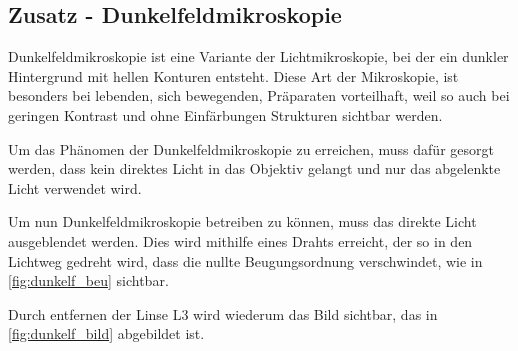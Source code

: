 \documentclass[11pt,ngerman]{scrartcl}
\begin{document}
\vspace{2mm}

\subsection{Zusatz - Dunkelfeldmikroskopie}

Dunkelfeldmikroskopie ist eine Variante der Lichtmikroskopie, bei der ein
dunkler Hintergrund mit hellen Konturen entsteht. Diese Art der Mikroskopie,
ist besonders bei lebenden, sich bewegenden, Präparaten vorteilhaft, weil so
auch bei geringen Kontrast und ohne Einfärbungen Strukturen sichtbar werden.

\newpage

Um das Phänomen der Dunkelfeldmikroskopie zu erreichen, muss dafür gesorgt
werden, dass kein direktes Licht in das Objektiv gelangt und nur das abgelenkte
Licht verwendet wird. \cite{wiki_dunkel_2021}

\vspace{2mm}

Um nun Dunkelfeldmikroskopie betreiben zu können, muss das direkte Licht
ausgeblendet werden. Dies wird mithilfe eines Drahts erreicht, der so in den
Lichtweg gedreht wird, dass die nullte Beugungsordnung verschwindet, wie in
\autoref{fig:dunkelf_beu} sichtbar.


Durch entfernen der Linse L3 wird wiederum das Bild sichtbar, das in \autoref{fig:dunkelf_bild} abgebildet ist.
\end{document}
